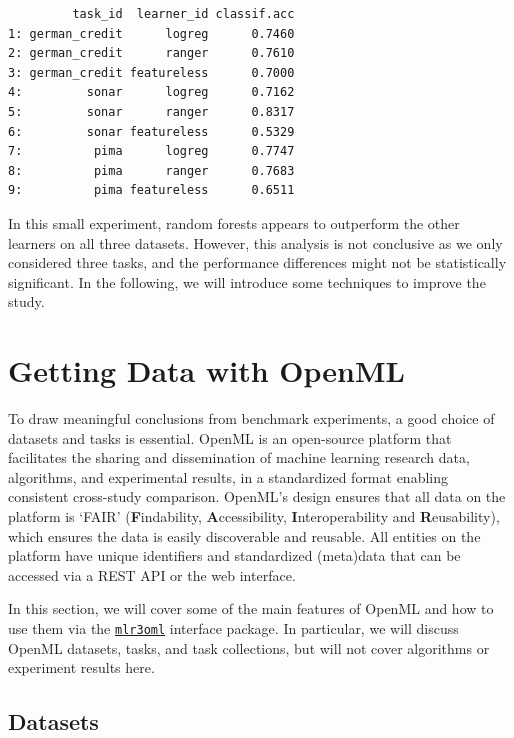 \begin{verbatim}
         task_id  learner_id classif.acc
1: german_credit      logreg      0.7460
2: german_credit      ranger      0.7610
3: german_credit featureless      0.7000
4:         sonar      logreg      0.7162
5:         sonar      ranger      0.8317
6:         sonar featureless      0.5329
7:          pima      logreg      0.7747
8:          pima      ranger      0.7683
9:          pima featureless      0.6511
\end{verbatim}

In this small experiment, random forests appears to outperform the other
learners on all three datasets. However, this analysis is not conclusive
as we only considered three tasks, and the performance differences might
not be statistically significant. In the following, we will introduce
some techniques to improve the study.

\hypertarget{sec-openml}{%
\section{Getting Data with OpenML}\label{sec-openml}}

To draw meaningful conclusions from benchmark experiments, a good choice
of datasets and tasks is essential.
OpenML
is an open-source platform that facilitates the sharing and
dissemination of machine learning research data, algorithms, and
experimental results, in a standardized format enabling consistent
cross-study comparison. OpenML's design ensures that all data on the
platform is `FAIR' (\textbf{F}indability,
\textbf{A}ccessibility, \textbf{I}nteroperability and
\textbf{R}eusability), which ensures the data is easily discoverable and
reusable. All entities on the platform have unique identifiers and
standardized (meta)data that can be accessed via a REST API or the web
interface.

In this section, we will cover some of the main features of OpenML and
how to use them via the
\href{https://mlr3oml.mlr-org.com}{\texttt{mlr3oml}}
interface package. In particular, we will discuss OpenML datasets,
tasks, and task collections, but will not cover algorithms or experiment
results here.

\hypertarget{sec-openml-dataset}{%
\subsection{Datasets}\label{sec-openml-dataset}}

